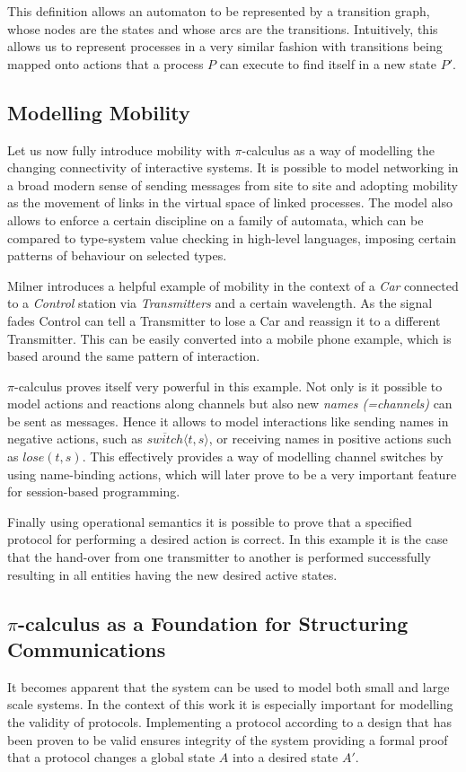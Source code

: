 This definition allows an automaton to be represented by a transition graph, whose nodes are the states and whose arcs are the transitions. Intuitively, this allows us to represent processes in a very similar fashion with transitions being mapped onto actions that a process $P$ can execute to find itself in a new state $P'$.


\subsection{Modelling Mobility}
\label{subsec:modelmobility}

Let us now fully introduce mobility with $\pi$-calculus as a way of modelling the changing connectivity of interactive systems. It is possible to model networking in a broad modern sense of sending messages from site to site and adopting mobility as the movement of links in the virtual space of linked processes. The model also allows to enforce a certain discipline on a family of automata, which can be compared to type-system value checking in high-level languages, imposing certain patterns of behaviour on selected types.

Milner\cite{pi-calculus} introduces a helpful example of mobility in the context of a \textit{Car} connected to a \textit{Control} station via \textit{Transmitters} and a certain wavelength. As the signal fades Control can tell a Transmitter to lose a Car and reassign it to a different Transmitter. This can be easily converted into a mobile phone example, which is based around the same pattern of interaction.

$\pi$-calculus proves itself very powerful in this example. Not only is it possible to model actions and reactions along channels but also new \textit{names (=channels)} can be sent as messages. Hence it allows to model interactions like sending names in negative actions, such as $\overline{switch}\langle t,s \rangle$, or receiving names in positive actions such as $lose(t,s)$. This effectively provides a way of modelling channel switches by using name-binding actions, which will later prove to be a very important feature for session-based programming.

Finally using operational semantics it is possible to prove that a specified protocol for performing a desired action is correct. In this example it is the case that the hand-over from one transmitter to another is performed successfully resulting in all entities having the new desired active states.

\subsection{$\pi$-calculus as a Foundation for Structuring Communications }
It becomes apparent that the system can be used to model both small and large scale systems. In the context of this work it is especially important for modelling the validity of protocols. Implementing a protocol according to a design that has been proven to be valid ensures integrity of the system providing a formal proof that a protocol changes a global state $A$ into a desired state $A'$.

